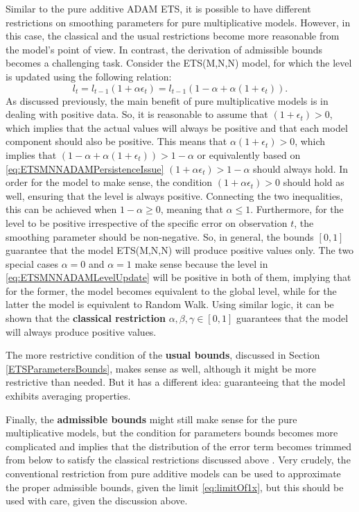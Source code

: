 \documentclass[]{book}
\theoremstyle{definition}
\theoremstyle{definition}
\theoremstyle{definition}
\theoremstyle{definition}
\theoremstyle{remark}
\begin{document}
Similar to the pure additive ADAM ETS, it is possible to have different restrictions on smoothing parameters for pure multiplicative models. However, in this case, the classical and the usual restrictions become more reasonable from the model's point of view. In contrast, the derivation of admissible bounds becomes a challenging task. Consider the ETS(M,N,N) model, for which the level is updated using the following relation:
\begin{equation}
    l_t = l_{t-1} (1 + \alpha\epsilon_t) = l_{t-1} (1-\alpha + \alpha(1+\epsilon_t)).
  \label{eq:ETSMNNADAMLevelUpdate}
\end{equation}
As discussed previously, the main benefit of pure multiplicative models is in dealing with positive data. So, it is reasonable to assume that \((1 + \epsilon_t)>0\), which implies that the actual values will always be positive and that each model component should also be positive. This means that \(\alpha(1 + \epsilon_t)>0\), which implies that \((1-\alpha + \alpha(1+\epsilon_t))>1-\alpha\) or equivalently based on \eqref{eq:ETSMNNADAMPersistenceIssue} \((1 + \alpha\epsilon_t)>1-\alpha\) should always hold. In order for the model to make sense, the condition \((1 + \alpha\epsilon_t)>0\) should hold as well, ensuring that the level is always positive. Connecting the two inequalities, this can be achieved when \(1-\alpha \geq 0\), meaning that \(\alpha \leq 1\). Furthermore, for the level to be positive irrespective of the specific error on observation \(t\), the smoothing parameter should be non-negative. So, in general, the bounds \([0, 1]\) guarantee that the model ETS(M,N,N) will produce positive values only. The two special cases \(\alpha=0\) and \(\alpha=1\) make sense because the level in \eqref{eq:ETSMNNADAMLevelUpdate} will be positive in both of them, implying that for the former, the model becomes equivalent to the global level, while for the latter the model is equivalent to Random Walk. Using similar logic, it can be shown that the \textbf{classical restriction} \(\alpha, \beta, \gamma \in [0, 1]\) guarantees that the model will always produce positive values.

The more restrictive condition of the \textbf{usual bounds}, discussed in Section \ref{ETSParametersBounds}, makes sense as well, although it might be more restrictive than needed. But it has a different idea: guaranteeing that the model exhibits averaging properties.

Finally, the \textbf{admissible bounds} might still make sense for the pure multiplicative models, but the condition for parameters bounds becomes more complicated and implies that the distribution of the error term becomes trimmed from below to satisfy the classical restrictions discussed above \citep[see, for example, discussion in][]{Akram2009}. Very crudely, the conventional restriction from pure additive models can be used to approximate the proper admissible bounds, given the limit \eqref{eq:limitOf1x}, but this should be used with care, given the discussion above.
\end{document}
